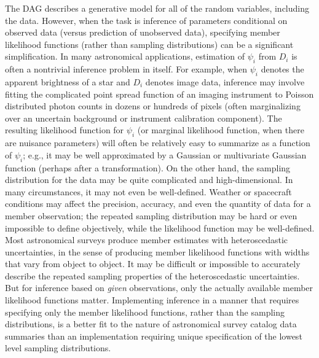 The DAG describes a generative model for all of the random variables, including the data.
However, when the task is inference of parameters conditional on observed data (versus prediction of unobserved data), specifying member likelihood functions (rather than sampling distributions) can be a significant simplification.
In many astronomical applications, estimation of $\psi_i$ from $D_i$ is often a nontrivial inference problem in itself.
For example, when $\psi_i$ denotes the apparent brightness of a star and $D_i$ denotes image data, inference may involve fitting the complicated point spread function of an imaging instrument to Poisson distributed photon counts in dozens or hundreds of pixels (often marginalizing over an uncertain background or instrument calibration component).
The resulting likelihood function for $\psi_i$ (or marginal likelihood function, when there are nuisance parameters) will often be relatively easy to summarize as a function of $\psi_i$; e.g., it may be well approximated by a Gaussian or multivariate Gaussian function (perhaps after a transformation).
On the other hand, the sampling distribution for the data may be quite complicated and high-dimensional.
In many circumstances, it may not even be well-defined.
Weather or spacecraft conditions may affect the precision, accuracy, and even the quantity of data for a member observation; the repeated sampling distribution may be hard or even impossible to define objectively, while the likelihood function may be well-defined.
Most astronomical surveys produce member estimates with heteroscedastic uncertainties, in the sense of producing member likelihood functions with widths that vary from object to object.
It may be difficult or impossible to accurately describe the repeated sampling properties of the heteroscedastic uncertainties.
But for inference based on \emph{given} observations, only the actually available member likelihood functions matter.
Implementing inference in a manner that requires specifying only the member likelihood functions, rather than the sampling distributions, is a better fit to the nature of astronomical survey catalog data summaries than an implementation requiring unique specification of the lowest level sampling distributions.

